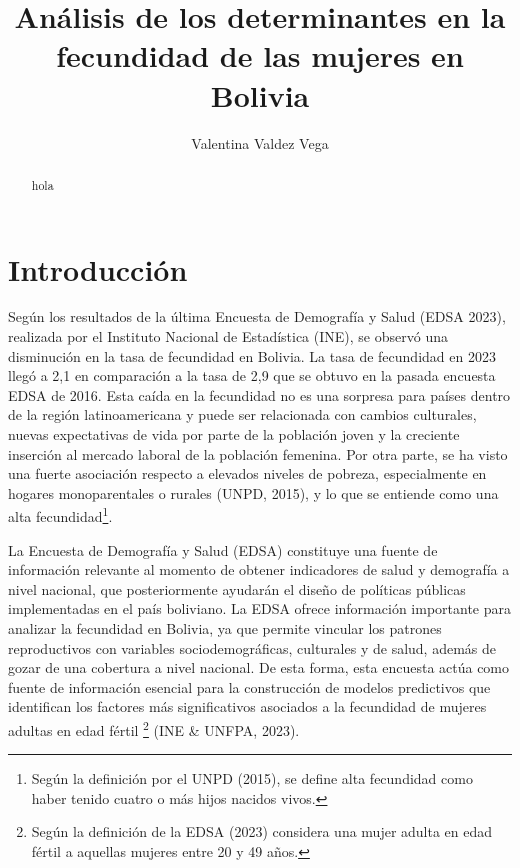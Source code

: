 \documentclass[Royal,times,sageh]{sagej}
\begin{document}

\title{Análisis de los determinantes en la fecundidad de las mujeres en
Bolivia}

\runninghead{}

\author{Valentina Valdez Vega}




\begin{abstract}
hola
\end{abstract}


\maketitle

\section{Introducción}\label{introducciuxf3n}

Según los resultados de la última Encuesta de Demografía y Salud (EDSA
2023), realizada por el Instituto Nacional de Estadística (INE), se
observó una disminución en la tasa de fecundidad en Bolivia. La tasa de
fecundidad en 2023 llegó a 2,1 en comparación a la tasa de 2,9 que se
obtuvo en la pasada encuesta EDSA de 2016. Esta caída en la fecundidad
no es una sorpresa para países dentro de la región latinoamericana y
puede ser relacionada con cambios culturales, nuevas expectativas de
vida por parte de la población joven y la creciente inserción al mercado
laboral de la población femenina. Por otra parte, se ha visto una fuerte
asociación respecto a elevados niveles de pobreza, especialmente en
hogares monoparentales o rurales (UNPD, 2015), y lo que se entiende como
una alta fecundidad\footnote{Según la definición por el UNPD (2015), se
  define alta fecundidad como haber tenido cuatro o más hijos nacidos
  vivos.}.

La Encuesta de Demografía y Salud (EDSA) constituye una fuente de
información relevante al momento de obtener indicadores de salud y
demografía a nivel nacional, que posteriormente ayudarán el diseño de
políticas públicas implementadas en el país boliviano. La EDSA ofrece
información importante para analizar la fecundidad en Bolivia, ya que
permite vincular los patrones reproductivos con variables
sociodemográficas, culturales y de salud, además de gozar de una
cobertura a nivel nacional. De esta forma, esta encuesta actúa como
fuente de información esencial para la construcción de modelos
predictivos que identifican los factores más significativos asociados a
la fecundidad de mujeres adultas en edad fértil \footnote{Según la
  definición de la EDSA (2023) considera una mujer adulta en edad fértil
  a aquellas mujeres entre 20 y 49 años.} (INE \& UNFPA, 2023).
\end{document}
